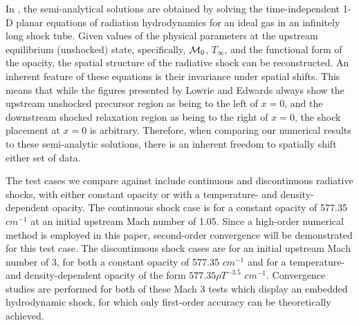 \documentclass[times,doublespace]{fldauth}%
\begin{document}
In \cite{LowrieEdwards}, the semi-analytical solutions are obtained by solving the time-independent 1-D planar equations of radiation hydrodynamics for an ideal gas in an infinitely long shock tube.
Given values of the physical parameters at the upstream equilibrium (unshocked) state, specifically, ${\cal M}_0$, $T_{\infty}$, and the functional form of the opacity, the spatial structure of the radiative shock can be reconstructed.
An inherent feature of these equations is their invariance under spatial shifts.
This means that while the figures presented by Lowrie and Edwards \cite{LowrieEdwards} always show the upstream unshocked precursor region as being to the left of $x = 0$, and the downstream shocked relaxation region as being to the right of $x = 0$, the shock placement at $x = 0$ is arbitrary.
Therefore, when comparing our numerical results to these semi-analytic solutions, there is an inherent freedom to spatially shift either set of data.

The test cases we compare against include continuous and discontinuous radiative shocks, 
with either constant opacity or with a temperature- and density-dependent opacity.
The continuous shock case is for a constant opacity of 577.35 $cm^{-1}$ at an initial upstream Mach number of 1.05.
Since a high-order numerical method is employed in this paper, second-order convergence will be demonstrated for this test case.
The discontinuous shock cases are for an initial upstream Mach number of 3, for both a constant opacity of 577.35 $cm^{-1}$ and for a temperature- and density-dependent opacity of the form $577.35 \rho T^{-3.5}$ $cm^{-1}$.
Convergence studies are performed for both of these Mach 3 tests which display an embedded hydrodynamic shock, for which only first-order accuracy can be theoretically achieved.
\end{document}
